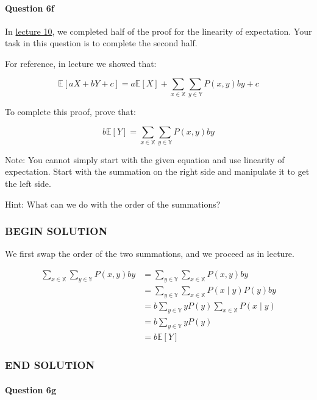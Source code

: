 \documentclass[11pt]{article}
\begin{document}
\paragraph{Question 6f}\label{question-6f}

In \href{http://www.ds100.org/fa18/syllabus\#lecture-week-6}{lecture
10}, we completed half of the proof for the linearity of expectation.
Your task in this question is to complete the second half.

For reference, in lecture we showed that:

\[\mathbb{E}[aX + bY + c] = a\mathbb{E}[X] + \sum_{x \in \mathbb{X}}\sum_{y \in \mathbb{Y}}P(x, y)by + c\]

To complete this proof, prove that:

\[b\mathbb{E}[Y] = \sum_{x \in \mathbb{X}}\sum_{y \in \mathbb{Y}}P(x, y)by\]

Note: You cannot simply start with the given equation and use linearity
of expectation. Start with the summation on the right side and
manipulate it to get the left side.

Hint: What can we do with the order of the summations?

    \subsubsection{BEGIN SOLUTION}\label{begin-solution}

We first swap the order of the two summations, and we proceed as in
lecture.

\[
\begin{aligned}
\sum_{x \in \mathbb{X}}\sum_{y \in \mathbb{Y}}P(x, y)by &= \sum_{y \in \mathbb{Y}}\sum_{x \in \mathbb{X}}P(x,y)by \\
&= \sum_{y \in \mathbb{Y}}\sum_{x \in \mathbb{X}}P(x \; \vert \; y)P(y)by \\
&= b\sum_{y \in \mathbb{Y}}yP(y)\sum_{x \in \mathbb{X}}P(x \; \vert \; y) \\
&= b\sum_{y \in \mathbb{Y}}yP(y) \\
&= b\mathbb{E}[Y]
\end{aligned}
\]

\subsubsection{END SOLUTION}\label{end-solution}

    \paragraph{Question 6g}\label{question-6g}
\end{document}

